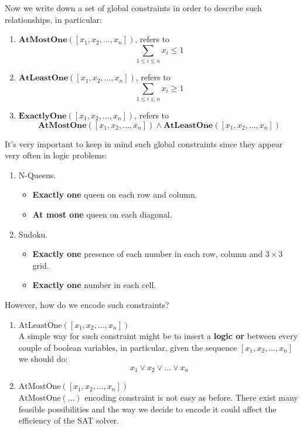 Now we write down a set of global constraints in order to describe such relationships, in particular:
\begin{enumerate}
    \item $\textbf{AtMostOne}([x_1, x_2, \dots, x_n])$, refers to $$\sum_{1 \leq i \leq n} x_i \leq 1$$
    \item $\textbf{AtLeastOne}([x_1, x_2, \dots, x_n])$, refers to $$\sum_{1 \leq i \leq n} x_i \geq 1$$
    \item $\textbf{ExactlyOne}([x_1, x_2, \dots, x_n])$, refers to $$\textbf{AtMostOne}([x_1, x_2, \dots, x_n]) \wedge \textbf{AtLeastOne}([x_1, x_2, \dots, x_n])$$
\end{enumerate}
It's very important to keep in mind such global constraints since they appear very often in logic problems:
\begin{enumerate}
    \item N-Queens. 
    \begin{itemize}
        \renewcommand{\labelitemi}{-}
        \item \textbf{Exactly one} queen on each row and column.
        \item \textbf{At most one} queen on each diagonal.
    \end{itemize}
    \item Sudoku.
    \begin{itemize}
        \renewcommand{\labelitemi}{-}
        \item \textbf{Exactly one} presence of each number in each row, column and $3 \times 3$ grid.
        \item \textbf{Exactly one} number in each cell.
    \end{itemize}
\end{enumerate}
However, how do we encode such constraints?
\begin{enumerate}
    \item $\text{AtLeastOne}([x_1, x_2, \dots, x_n])$ \\ 
    A simple way for such constraint might be to insert a \textbf{logic or} between every couple of boolean variables, in particular, given the sequence $[x_1, x_2, \dots, x_n]$ we should do:
    $$x_1 \vee x_2 \vee \dots \vee x_n$$
    \item $\text{AtMostOne}([x_1, x_2, \dots, x_n])$ \\ 
    $\text{AtMostOne}(\dots)$ encoding constraint is not easy as before. There exist many feasible possibilities and the way we decide to encode it could affect the efficiency of the SAT solver.
\end{enumerate}
